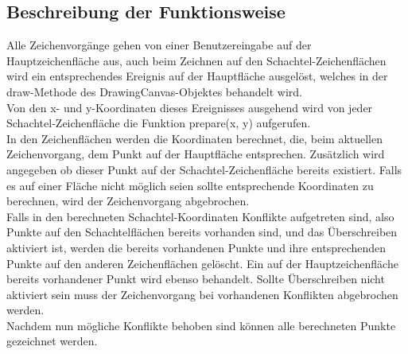 \subsection{Beschreibung der Funktionsweise}
\label{subsec:funktionsweise}

Alle Zeichenvorgänge gehen von einer Benutzereingabe auf der Hauptzeichenfläche aus, auch beim Zeichnen auf den Schachtel-Zeichenflächen wird ein entsprechendes Ereignis auf der Hauptfläche ausgelöst, welches in der draw-Methode des DrawingCanvas-Objektes behandelt wird.\\

Von den x- und y-Koordinaten dieses Ereignisses ausgehend wird von jeder Schachtel-Zeichenfläche die Funktion prepare(x, y) aufgerufen.\\

In den Zeichenflächen werden die Koordinaten berechnet, die, beim aktuellen Zeichenvorgang, dem Punkt auf der Hauptfläche entsprechen. Zusätzlich wird angegeben ob dieser Punkt auf der Schachtel-Zeichenfläche bereits existiert. Falls es auf einer Fläche nicht möglich seien sollte entsprechende Koordinaten zu berechnen, wird der Zeichenvorgang abgebrochen.\\

Falls in den berechneten Schachtel-Koordinaten Konflikte aufgetreten sind, also Punkte auf den Schachtelflächen bereits vorhanden sind, und das Überschreiben aktiviert ist, werden die bereits vorhandenen Punkte und ihre entsprechenden Punkte auf den anderen Zeichenflächen gelöscht. Ein auf der Hauptzeichenfläche bereits vorhandener Punkt wird ebenso behandelt. Sollte Überschreiben nicht aktiviert sein muss der Zeichenvorgang bei vorhandenen Konflikten abgebrochen werden.\\

Nachdem nun mögliche Konflikte behoben sind können alle berechneten Punkte gezeichnet werden.\\


